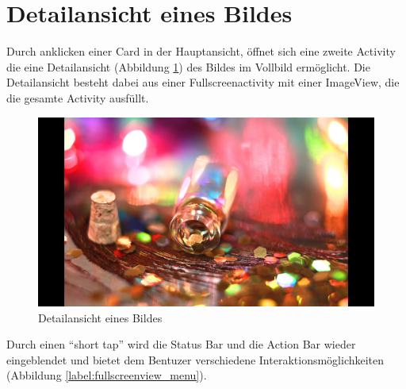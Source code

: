 \section{Detailansicht eines Bildes}
Durch anklicken einer Card in der Hauptansicht, öffnet sich eine zweite Activity die eine Detailansicht (Abbildung \ref{label:fullscreenview}) des Bildes im Vollbild ermöglicht. Die Detailansicht besteht dabei aus einer Fullscreenactivity mit einer ImageView, die die gesamte Activity ausfüllt.
\begin{figure}[H]
\centering
\includegraphics[scale=0.09]{images/screenshots/fullscreenview.png}
\caption{Detailansicht eines Bildes}
\label{label:fullscreenview}
\end{figure}

Durch einen \enquote{short tap} wird die Status Bar und die Action Bar wieder eingeblendet und bietet dem Bentuzer verschiedene Interaktionsmöglichkeiten (Abbildung \ref{label:fullscreenview_menu}).

